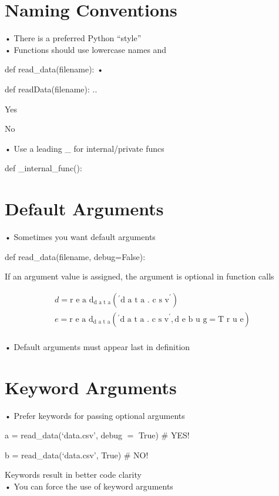 \documentclass[
  letterpaper,
  DIV=11,
  numbers=noendperiod]{scrreprt}
\begin{document}
\chapter{Naming Conventions}\label{naming-conventions-1}

• There is a preferred Python ``style''\\
• Functions should use lowercase names and

def read\_data(filename): •

def readData(filename): ..

Yes

No

• Use a leading \_ for internal/private funcs

def \_internal\_func():


\chapter{Default Arguments}\label{default-arguments}

• Sometimes you want default arguments

def read\_data(filename, debug=False):

If an argument value is assigned, the argument is optional in function
calls

\[
\begin{array}{l} d = \text {r e a d} _ {\text {d a t a}} \left(^ {\prime} \text {d a t a . c s v} ^ {\prime}\right) \\ e = \text {r e a d} _ {\text {d a t a}} \left(^ {\prime} \text {d a t a . c s v} ^ {\prime}, \text {d e b u g} = \text {T r u e}\right) \\ \end{array}
\]

• Default arguments must appear last in definition


\chapter{Keyword Arguments}\label{keyword-arguments}

• Prefer keywords for passing optional arguments

a = read\_data(`data.csv', debug \(=\) True) \# YES!

b = read\_data(`data.csv', True) \# NO!

Keywords result in better code clarity\\
• You can force the use of keyword arguments
\end{document}
